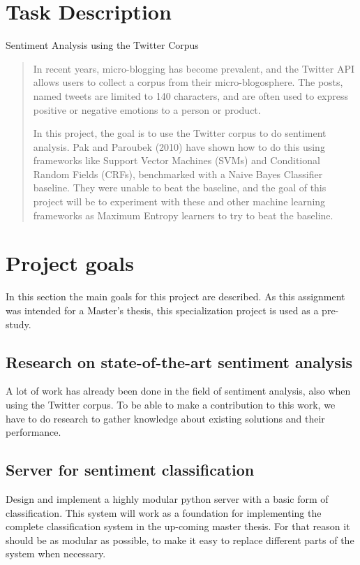 \section{Task Description}

\begin{center} \Large Sentiment Analysis using the Twitter Corpus \end{center}
\begin{quotation}
In recent years, micro-blogging has become prevalent, and the Twitter API allows users to collect a corpus from their micro-blogosphere. The posts, named tweets are limited to 140 characters, and are often used to express positive or negative emotions to a person or product.

In this project, the goal is to use the Twitter corpus to do sentiment analysis. Pak and Paroubek (2010) have shown how to do this using frameworks like Support Vector Machines (SVMs) and Conditional Random Fields (CRFs), benchmarked with a Naive Bayes Classifier baseline. They were unable to beat the baseline, and the goal of this project will be to experiment with these and other machine learning frameworks as Maximum Entropy learners to try to beat the baseline.
\end{quotation}

\section{Project goals}
In this section the main goals for this project are described. As this assignment was intended for a Master's thesis, this specialization project is used as a pre-study.

	\subsection{Research on state-of-the-art sentiment analysis}
	A lot of work has already been done in the field of sentiment analysis, also when using the Twitter corpus. To be able to make a contribution to this work, we have to do research to gather knowledge about existing solutions and their performance.

	\subsection{Server for sentiment classification}
	Design and implement a highly modular python server with a basic form of classification. This system will work as a foundation for implementing the complete classification system in the up-coming master thesis. For that reason it should be as modular as possible, to make it easy to replace different parts of the system when necessary.

